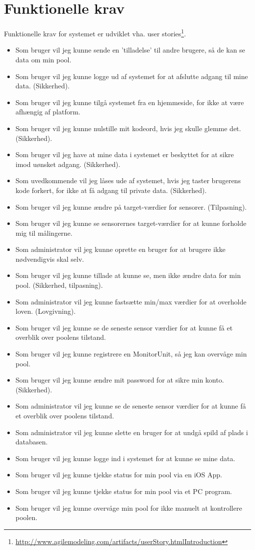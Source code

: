 \section{Funktionelle krav}
Funktionelle krav for systemet er udviklet vha. user stories\footnote{\url{http://www.agilemodeling.com/artifacts/userStory.htmlIntroduction}}.

\begin{itemize}
	\item Som bruger vil jeg kunne sende en ’tilladelse’ til andre brugere, så de kan se data om min pool.
	\item Som bruger vil jeg kunne logge ud af systemet for at afslutte adgang til mine data. (Sikkerhed).
	\item Som bruger vil jeg kunne tilgå systemet fra en hjemmeside, for ikke at være afhængig af platform.
	\item Som bruger vil jeg kunne nulstille mit kodeord, hvis jeg skulle glemme det. (Sikkerhed).
	\item Som bruger vil jeg have at mine data i systemet er beskyttet for at sikre imod uønsket adgang. (Sikkerhed).
	\item Som uvedkommende vil jeg låses ude af systemet, hvis jeg taster brugerens kode forkert, for ikke at få adgang til private data. (Sikkerhed).
	\item Som bruger vil jeg kunne ændre på target-værdier for sensorer. (Tilpasning).
	\item Som bruger vil jeg kunne se sensorernes target-værdier for at kunne forholde mig til målingerne.
	\item Som administrator vil jeg kunne oprette en bruger for at brugere ikke nødvendigvis skal selv.
	\item Som bruger vil jeg kunne tillade at kunne se, men ikke ændre data for min pool. (Sikkerhed, tilpasning).
	\item Som administrator vil jeg kunne fastsætte min/max værdier for at overholde loven. (Lovgivning).
	\item Som bruger vil jeg kunne se de seneste sensor værdier for at kunne få et overblik over poolens tilstand.
	\item Som bruger vil jeg kunne registrere en MonitorUnit, så jeg kan overvåge min pool.
	\item Som bruger vil jeg kunne ændre mit password for at sikre min konto. (Sikkerhed).
	\item Som administrator vil jeg kunne se de seneste sensor værdier for at kunne få et overblik over poolens tilstand.
	\item Som administrator vil jeg kunne slette en bruger for at undgå spild af plads i databasen.
	\item Som bruger vil jeg kunne logge ind i systemet for at kunne se mine data.
	\item Som bruger vil jeg kunne tjekke status for min pool via en iOS App.
	\item Som bruger vil jeg kunne tjekke status for min pool via et PC program.
	\item Som bruger vil jeg kunne overvåge min pool for ikke manuelt at kontrollere poolen.
\end{itemize}

\newpage